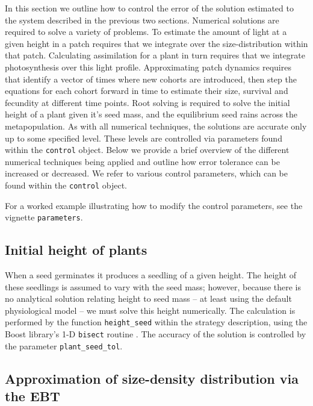 \documentclass[10pt,twoside]{article}
\begin{document}
In this section we outline how to control the error of the solution
estimated to the system described in the previous two sections.
Numerical solutions are required to solve a variety of problems. To
estimate the amount of light at a given height in a patch requires that
we integrate over the size-distribution within that patch. Calculating
assimilation for a plant in turn requires that we integrate
photosynthesis over this light profile. Approximating patch dynamics
requires that identify a vector of times where new cohorts are
introduced, then step the equations for each cohort forward in time to
estimate their size, survival and fecundity at different time points.
Root solving is required to solve the initial height of a plant given
it's seed mass, and the equilibrium seed rains across the
metapopulation. As with all numerical techniques, the solutions are
accurate only up to some specified level. These levels are controlled
via parameters found within the \texttt{control} object. Below we
provide a brief overview of the different numerical techniques being
applied and outline how error tolerance can be increased or decreased. 
We refer to various control parameters, which can be found within the 
\texttt{control} object. 

For a worked example illustrating how to modify the control parameters, 
see the vignette \texttt{parameters}.

\subsection{Initial height of plants}\label{initial-height-of-plants}

When a seed germinates it produces a seedling of a given height. The
height of these seedlings is assumed to vary with the seed mass;
however, because there is no analytical solution relating height to seed
mass -- at least using the default physiological model -- we must solve
this height numerically. The calculation is performed by the function
\texttt{height\_seed} within the strategy description, using the Boost
library's 1-D \texttt{bisect} routine
\citep{Schaling-2014, Eddelbuettel-2015}. The accuracy of the solution
is controlled by the parameter \texttt{plant\_seed\_tol}.

\subsection{Approximation of size-density distribution via the EBT}
\label{approximation-of-size-density-distribution-via-the-ebt}
\end{document}
